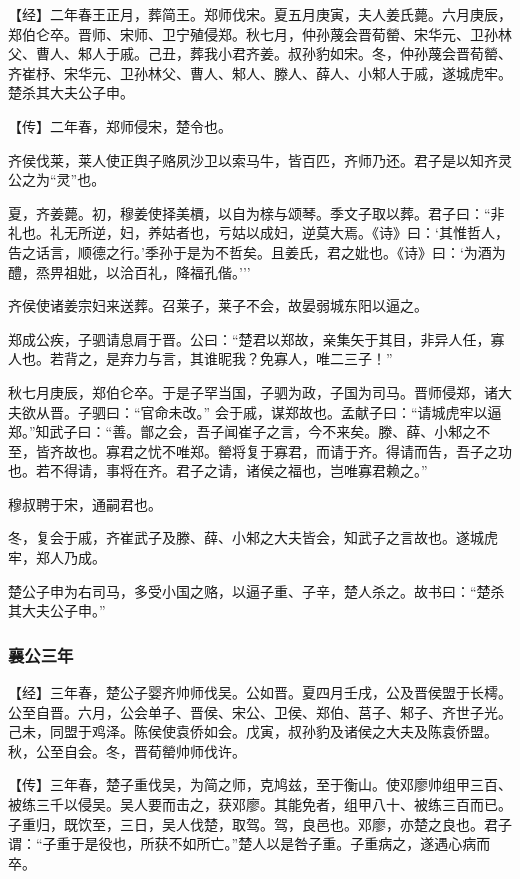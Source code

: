 \documentclass[]{article}
\begin{document}
【经】二年春王正月，葬简王。郑师伐宋。夏五月庚寅，夫人姜氏薨。六月庚辰，郑伯仑卒。晋师、宋师、卫宁殖侵郑。秋七月，仲孙蔑会晋荀罃、宋华元、卫孙林父、曹人、邾人于戚。己丑，葬我小君齐姜。叔孙豹如宋。冬，仲孙蔑会晋荀罃、齐崔杼、宋华元、卫孙林父、曹人、邾人、滕人、薛人、小邾人于戚，遂城虎牢。楚杀其大夫公子申。

【传】二年春，郑师侵宋，楚令也。

齐侯伐莱，莱人使正舆子赂夙沙卫以索马牛，皆百匹，齐师乃还。君子是以知齐灵公之为``灵''也。

夏，齐姜薨。初，穆姜使择美檟，以自为榇与颂琴。季文子取以葬。君子曰：``非礼也。礼无所逆，妇，养姑者也，亏姑以成妇，逆莫大焉。《诗》曰：`其惟哲人，告之话言，顺德之行。'季孙于是为不哲矣。且姜氏，君之妣也。《诗》曰：`为酒为醴，烝畀祖妣，以洽百礼，降福孔偕。'''

齐侯使诸姜宗妇来送葬。召莱子，莱子不会，故晏弱城东阳以逼之。

郑成公疾，子驷请息肩于晋。公曰：``楚君以郑故，亲集矢于其目，非异人任，寡人也。若背之，是弃力与言，其谁昵我？免寡人，唯二三子！''

秋七月庚辰，郑伯仑卒。于是子罕当国，子驷为政，子国为司马。晋师侵郑，诸大夫欲从晋。子驷曰：``官命未改。''
会于戚，谋郑故也。孟献子曰：``请城虎牢以逼郑。''知武子曰：``善。鄫之会，吾子闻崔子之言，今不来矣。滕、薛、小邾之不至，皆齐故也。寡君之忧不唯郑。罃将复于寡君，而请于齐。得请而告，吾子之功也。若不得请，事将在齐。君子之请，诸侯之福也，岂唯寡君赖之。''

穆叔聘于宋，通嗣君也。

冬，复会于戚，齐崔武子及滕、薛、小邾之大夫皆会，知武子之言故也。遂城虎牢，郑人乃成。

楚公子申为右司马，多受小国之赂，以逼子重、子辛，楚人杀之。故书曰：``楚杀其大夫公子申。''

\hypertarget{header-n1831}{%
\subsubsection{襄公三年}\label{header-n1831}}

【经】三年春，楚公子婴齐帅师伐吴。公如晋。夏四月壬戌，公及晋侯盟于长樗。公至自晋。六月，公会单子、晋侯、宋公、卫侯、郑伯、莒子、邾子、齐世子光。己未，同盟于鸡泽。陈侯使袁侨如会。戊寅，叔孙豹及诸侯之大夫及陈袁侨盟。秋，公至自会。冬，晋荀罃帅师伐许。

【传】三年春，楚子重伐吴，为简之师，克鸠兹，至于衡山。使邓廖帅组甲三百、被练三千以侵吴。吴人要而击之，获邓廖。其能免者，组甲八十、被练三百而已。子重归，既饮至，三日，吴人伐楚，取驾。驾，良邑也。邓廖，亦楚之良也。君子谓：``子重于是役也，所获不如所亡。''楚人以是咎子重。子重病之，遂遇心病而卒。
\end{document}
